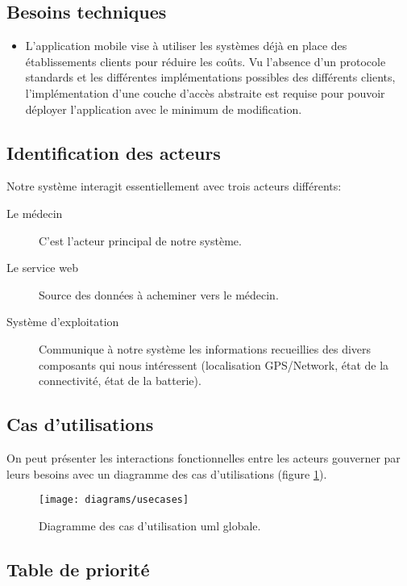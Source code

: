 \subsection{Besoins techniques}

\begin{itemize}

\item L’application mobile vise à utiliser les systèmes déjà en place des
établissements clients pour réduire les coûts. Vu l’absence d'un protocole
standards et les différentes implémentations possibles des différents clients,
l'implémentation d'une couche d’accès abstraite est requise pour pouvoir
déployer l’application avec le minimum de modification.

\end{itemize}

\subsection{Identification des acteurs}

Notre système interagit essentiellement avec trois acteurs différents:

\begin{description}

\item[Le médecin] C'est l'acteur principal de notre système.

\item[Le service web] Source des données à acheminer vers le médecin.

\item[Système d'exploitation] Communique à notre système les
informations recueillies des divers composants qui nous intéressent
(localisation GPS/Network, état de la connectivité, état de la
batterie).

\end{description}

\subsection{Cas d'utilisations}

On peut présenter les interactions fonctionnelles entre les acteurs gouverner par leurs besoins avec un diagramme des cas d'utilisations (figure \ref{fig:uml_usecase}).

\begin{figure}
\center
\texttt{[image: diagrams/usecases]}
\caption{Diagramme des cas d'utilisation \gls{uml} globale.}
\label{fig:uml_usecase}
\end{figure}

\subsection{Table de priorité}

